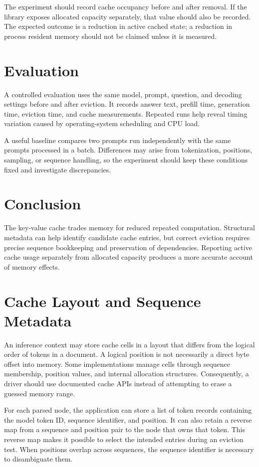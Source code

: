 \documentclass{article}
\begin{document}
The experiment should record cache occupancy before and after removal. If the library exposes allocated capacity separately, that value should also be recorded. The expected outcome is a reduction in active cached state; a reduction in process resident memory should not be claimed unless it is measured.

\section{Evaluation}
A controlled evaluation uses the same model, prompt, question, and decoding settings before and after eviction. It records answer text, prefill time, generation time, eviction time, and cache measurements. Repeated runs help reveal timing variation caused by operating-system scheduling and CPU load.

A useful baseline compares two prompts run independently with the same prompts processed in a batch. Differences may arise from tokenization, positions, sampling, or sequence handling, so the experiment should keep these conditions fixed and investigate discrepancies.

\section{Conclusion}
The key-value cache trades memory for reduced repeated computation. Structural metadata can help identify candidate cache entries, but correct eviction requires precise sequence bookkeeping and preservation of dependencies. Reporting active cache usage separately from allocated capacity produces a more accurate account of memory effects.


\section{Cache Layout and Sequence Metadata}
An inference context may store cache cells in a layout that differs from the logical order of tokens in a document. A logical position is not necessarily a direct byte offset into memory. Some implementations manage cells through sequence membership, position values, and internal allocation structures. Consequently, a driver should use documented cache APIs instead of attempting to erase a guessed memory range.

For each parsed node, the application can store a list of token records containing the model token ID, sequence identifier, and position. It can also retain a reverse map from a sequence and position pair to the node that owns that token. This reverse map makes it possible to select the intended entries during an eviction test. When positions overlap across sequences, the sequence identifier is necessary to disambiguate them.
\end{document}
